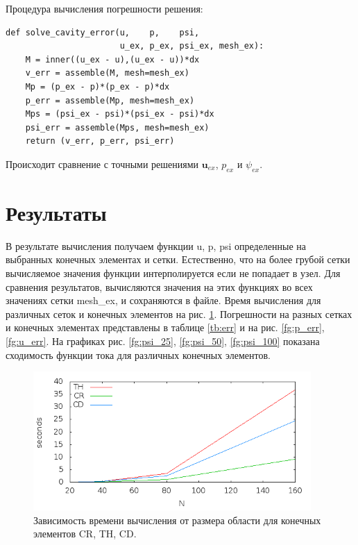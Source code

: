 \documentclass[12pt]{article}
\begin{document}
Процедура вычисления погрешности решения:
\begin{lstlisting}
def solve_cavity_error(u,    p,    psi,    
                       u_ex, p_ex, psi_ex, mesh_ex):
    M = inner((u_ex - u),(u_ex - u))*dx
    v_err = assemble(M, mesh=mesh_ex)    
    Mp = (p_ex - p)*(p_ex - p)*dx
    p_err = assemble(Mp, mesh=mesh_ex)
    Mps = (psi_ex - psi)*(psi_ex - psi)*dx
    psi_err = assemble(Mps, mesh=mesh_ex)
    return (v_err, p_err, psi_err)
\end{lstlisting}
Происходит сравнение с точными решениями ${\bm u_{ex}}$, $p_{ex}$ и $\psi_{ex}$.

\section{Результаты}
В результате вычисления получаем функции u, p, psi определенные на выбранных конечных элементах и сетки. Естественно, что на более грубой сетки вычисляемое значения функции интерполируется если не попадает в узел. Для сравнения результатов, вычисляются значения на этих функциях во всех значениях сетки mesh\_ex, и сохраняются в файле. Время вычисления для различных сеток и конечных элементов на рис. \ref{fg:time}. Погрешности на разных сетках и конечных элементах представлены в таблице \ref{tb:err} и на рис. \ref{fg:p_err}, \ref{fg:u_err}.
На графиках рис. \ref{fg:psi_25}, \ref{fg:psi_50}, \ref{fg:psi_100} показана сходимость функции тока для различных конечных элементов. 

\begin{figure}
	\begin{center}
		\includegraphics[width=400px]{pics/time}
		\caption{Зависимость времени вычисления от размера области для конечных элементов CR, TH, CD.}
		\label{fg:time}
	\end{center}
\end{figure}
\end{document}
